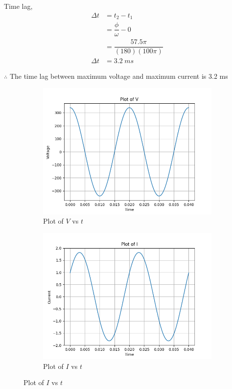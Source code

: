 \documentclass[journal,12pt,onecolumn]{IEEEtran}
\theoremstyle{remark}
\begin{document}
	Time lag,
	\begin{align}
		\Delta t &= t_2 - t_1\\[5pt]
			&= \dfrac{\phi}{\omega} - 0\\[5pt]
			&=  \dfrac{57.5 \pi}{(180)(100 \pi)}\\[5pt]
		\Delta t &= 3.2 \hspace{3pt} ms
	\end{align}
	
	$\therefore$ \hspace{0.2cm}The time lag between maximum voltage and maximum current is 3.2 ms
	
	\vspace{0.3cm}
	\begin{figure}[htbp]
		\centering
		\begin{subfigure}{0.47\textwidth}
			\centering
			\includegraphics[width=\linewidth]{figs/Fig1.png}
			\caption{Plot of $V$ vs $t$}
		\end{subfigure}
		\hfill
		\begin{subfigure}{0.47\textwidth}
			\centering
			\includegraphics[width=\linewidth]{figs/Fig2.png}
			\caption{Plot of $I$ vs $t$}
		\end{subfigure}
	\end{figure}
	
	
\end{document}
